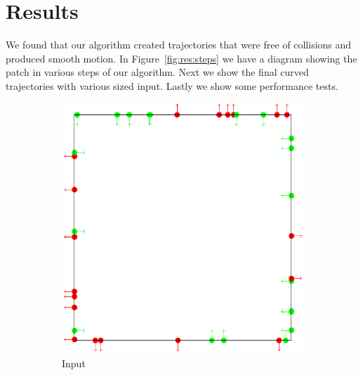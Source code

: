 \section{Results}
\label{sec:results}

We found that our algorithm created trajectories that were free of collisions and produced smooth motion. In Figure~\ref{fig:res:steps} we have a diagram showing the patch in various steps of our algorithm. Next we show the final curved trajectories with various sized input. Lastly we show some performance tests.


\begin{figure}[t]
 \centering
 \begin{subfigure}[b]{0.24\linewidth}
 	\includegraphics[width=\linewidth]{images/steps-input.png}
 	\caption{Input}
 \end{subfigure}
 \begin{subfigure}[b]{0.24\linewidth}

\end{subfigure}
\end{figure}
